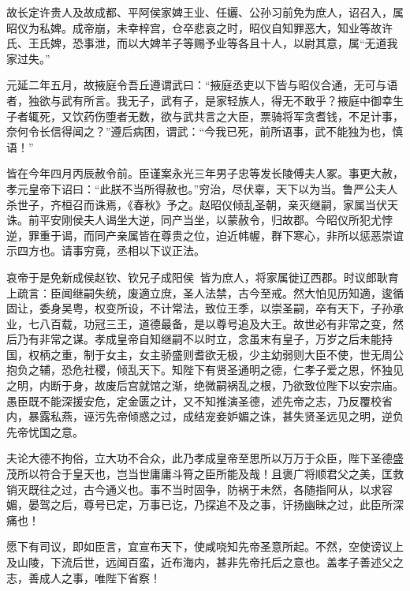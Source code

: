 \documentclass[12pt,UTF8]{ctexbook}
\begin{document}
故长定许贵人及故成都、平阿侯家婢王业、任孋、公孙习前免为庶人，诏召入，属昭仪为私婢。成帝崩，未幸梓宫，仓卒悲哀之时，昭仪自知罪恶大，知业等故许氏、王氏婢，恐事泄，而以大婢羊子等赐予业等各且十人，以尉其意，属“无道我家过失。”



元延二年五月，故掖庭令吾丘遵谓武曰：“掖庭丞吏以下皆与昭仪合通，无可与语者，独欲与武有所言。我无子，武有子，是家轻族人，得无不敢乎？掖庭中御幸生子者辄死，又饮药伤堕者无数，欲与武共言之大臣，票骑将军贪耆钱，不足计事，奈何令长信得闻之？”遵后病困，谓武：“今我已死，前所语事，武不能独为也，慎语！”



皆在今年四月丙辰赦令前。臣谨案永光三年男子忠等发长陵傅夫人冢。事更大赦，孝元皇帝下诏曰：“此朕不当所得赦也。”穷治，尽伏辜，天下以为当。鲁严公夫人杀世子，齐桓召而诛焉，《春秋》予之。赵昭仪倾乱圣朝，亲灭继嗣，家属当伏天诛。前平安刚侯夫人谒坐大逆，同产当坐，以蒙赦令，归故郡。今昭仪所犯尤悖逆，罪重于谒，而同产亲属皆在尊贵之位，迫近帏幄，群下寒心，非所以惩恶崇谊示四方也。请事穷竟，丞相以下议正法。



哀帝于是免新成侯赵钦、钦兄子成阳侯，皆为庶人，将家属徙辽西郡。时议郎耿育上疏言：臣闻继嗣失统，废適立庶，圣人法禁，古今至戒。然大怕见历知適，逡循固让，委身吴粤，权变所设，不计常法，致位王季，以崇圣嗣，卒有天下，子孙承业，七八百载，功冠三王，道德最备，是以尊号追及大王。故世必有非常之变，然后乃有非常之谋。孝成皇帝自知继嗣不以时立，念虽末有皇子，万岁之后未能持国，权柄之重，制于女主，女主骄盛则耆欲无极，少主幼弱则大臣不使，世无周公抱负之辅，恐危社稷，倾乱天下。知陛下有贤圣通明之德，仁孝子爱之恩，怀独见之明，内断于身，故废后宫就馆之渐，绝微嗣祸乱之根，乃欲致位陛下以安宗庙。愚臣既不能深援安危，定金匮之计，又不知推演圣德，述先帝之志，乃反覆校省内，暴露私燕，诬污先帝倾惑之过，成结宠妾妒媚之诛，甚失贤圣远见之明，逆负先帝忧国之意。



夫论大德不拘俗，立大功不合众，此乃孝成皇帝至思所以万万于众臣，陛下圣德盛茂所以符合于皇天也，岂当世庸庸斗筲之臣所能及哉！且褒广将顺君父之美，匡救销灭既往之过，古今通义也。事不当时固争，防祸于未然，各随指阿从，以求容媚，晏驾之后，尊号已定，万事已讫，乃探追不及之事，讦扬幽昧之过，此臣所深痛也！



愿下有司议，即如臣言，宜宣布天下，使咸哓知先帝圣意所起。不然，空使谤议上及山陵，下流后世，远闻百蛮，近布海内，甚非先帝托后之意也。盖孝子善述父之志，善成人之事，唯陛下省察！
\end{document}
